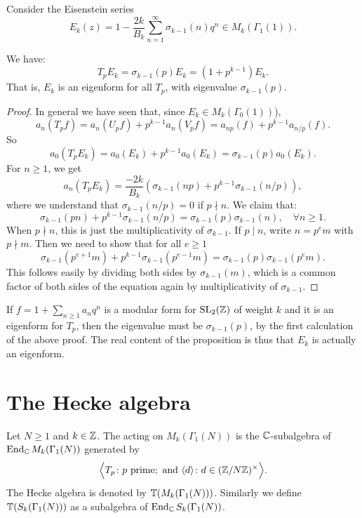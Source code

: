 \begin{example}
  Consider the Eisenstein series
\[
E_k(z)=1-\frac{2k}{B_k}\sum_{n=1}^\infty \sigma_{k-1}(n)q^n\in M_k(\Gamma_1(1)).
\]
\begin{proposition}
We have:
\[
T_p E_k = \sigma_{k-1}(p) E_k = (1+p^{k-1})E_k.
\]
That is, $E_k$ is an eigenform for all $T_p$, with eigenvalue $\sigma_{k-1}(p)$.
\end{proposition}
\begin{proof}
 In general we have seen that, since $E_k\in M_k(\Gamma_0(1))$),
\[
a_n(T_pf)= a_n(U_p f) + p^{k-1} a_n(V_p f) = a_{np}(f)+p^{k-1} a_{n/p}(f).
\]
So
\[
a_0(T_pE_k) = a_0(E_k) + p^{k-1} a_0(E_k) = \sigma_{k-1}(p) a_0(E_k).
\]
For $n\geq 1$, we get
\[
a_n(T_pE_k) = \frac{-2k}{B_k}\left(\sigma_{k-1}(np)+p^{k-1}\sigma_{k-1}(n/p)\right),
\]
where we understand that $\sigma_{k-1}(n/p)=0$ if $p\nmid n$. We claim that:
\[
\sigma_{k-1}(pn) + p^{k-1}\sigma_{k-1}(n/p) = \sigma_{k-1}(p)\sigma_{k-1}(n),\quad \forall n\geq 1.
\]
When $p\nmid n$, this is just the multiplicativity of $\sigma_{k-1}$. If $p\mid n$, write $n=p^em$ with $p\nmid m$. Then we need to show that for all $e\geq 1$
\[
\sigma_{k-1}(p^{e+1}m) + p^{k-1}\sigma_{k-1}(p^{e-1}m) = \sigma_{k-1}(p)\sigma_{k-1}(p^em).
\]
This follows easily by dividing both sides by $\sigma_{k-1}(m)$, which is a common factor of both sides of the equation again by multiplicativity of $\sigma_{k-1}$.
\end{proof}
\begin{remark}
  If $f=1+\sum_{n\geq 1} a_n q^n$ is a modular form for $\operatorname{SL}_2(\mathbb{Z})$ of weight $k$ and it is an eigenform for $T_p$, then the eigenvalue must be $\sigma_{k-1}(p)$, by the first calculation of the above proof. The real content of the proposition is thus that $E_k$ is actually an eigenform.
\end{remark}
\end{example}
\section{The Hecke algebra}
\begin{definition}
  Let $N\geq 1$ and $k\in \mathbb{Z}$. The  acting on $M_k(\Gamma_1(N))$ is the $\mathbb{C}$-subalgebra of $\operatorname{End}_{\mathbb{C}} M_k(\Gamma_1(N))$ generated by
\[
\Big\langle T_p\colon p\text{ prime};\text{ and } \langle d\rangle \colon d\in (\mathbb{Z}/N\mathbb{Z})^\times\Big\rangle.
\]
The Hecke algebra is denoted by $\mathbb{T}(M_k(\Gamma_1(N)))$. Similarly we define $\mathbb{T}(S_k(\Gamma_1(N)))$ as a subalgebra of $\operatorname{End}_{\mathbb{C}} S_k(\Gamma_1(N))$.
\end{definition}

